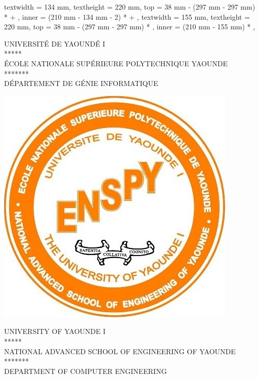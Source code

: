 
\ifprintVersion
    \newgeometry
    {
        textwidth = 134 mm,
        textheight = 220 mm,
        top = 38 mm - (297 mm - 297 mm) *  + \extraborderlength,
        inner = (210 mm - 134 mm - 2\extraborderlength ) *   + \extraborderlength,
    }
\else
    \newgeometry
    {
        textwidth = 155 mm,
        textheight = 220 mm,
        top = 38 mm - (297 mm - 297 mm) * ,
        inner = (210 mm - 155 mm) * ,
    }
\fi

\begin{titlingpage}
\begin{singlespace}
    \begin{center}
        \begin{minipage}{0.35\textwidth}
    		\begin{center}
    			UNIVERSITÉ DE YAOUNDÉ I \\
    			*****\\
    			ÉCOLE NATIONALE SUPÉRIEURE POLYTECHNIQUE YAOUNDE\\
    			*******\\
    			DÉPARTEMENT DE GÉNIE INFORMATIQUE\\
    		\end{center}
    	\end{minipage}
    	\begin{minipage}{0.29\textwidth}
        	\begin{center}
        	     \includegraphics[height = 3 cm]{resources/ensp_logo.jpg}    
        	\end{center}
        \end{minipage}
        \begin{minipage}{0.35\textwidth}\raggedright
        	\begin{center}
        			UNIVERSITY OF YAOUNDE I\\
        		*****\\
        		NATIONAL ADVANCED SCHOOL OF ENGINEERING OF YAOUNDE\\
        		*******\\
        		DEPARTMENT OF COMPUTER ENGINEERING\\
        	\end{center}
        \end{minipage}

\end{center}
\end{singlespace}
\end{titlingpage}
